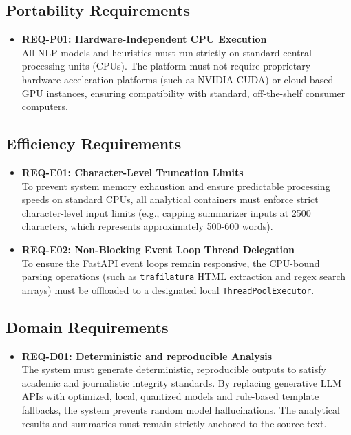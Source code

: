 \subsection{Portability Requirements}
\begin{itemize}
    \item \textbf{REQ-P01: Hardware-Independent CPU Execution} \\
    All NLP models and heuristics must run strictly on standard central processing units (CPUs). The platform must not require proprietary hardware acceleration platforms (such as NVIDIA CUDA) or cloud-based GPU instances, ensuring compatibility with standard, off-the-shelf consumer computers.
\end{itemize}

\subsection{Efficiency Requirements}
\begin{itemize}
    \item \textbf{REQ-E01: Character-Level Truncation Limits} \\
    To prevent system memory exhaustion and ensure predictable processing speeds on standard CPUs, all analytical containers must enforce strict character-level input limits (e.g., capping summarizer inputs at 2500 characters, which represents approximately 500-600 words).
    \item \textbf{REQ-E02: Non-Blocking Event Loop Thread Delegation} \\
    To ensure the FastAPI event loops remain responsive, the CPU-bound parsing operations (such as \texttt{trafilatura} HTML extraction and regex search arrays) must be offloaded to a designated local \texttt{ThreadPoolExecutor}.
\end{itemize}

\subsection{Domain Requirements}
\begin{itemize}
    \item \textbf{REQ-D01: Deterministic and reproducible Analysis} \\
    The system must generate deterministic, reproducible outputs to satisfy academic and journalistic integrity standards. By replacing generative LLM APIs with optimized, local, quantized models and rule-based template fallbacks, the system prevents random model hallucinations. The analytical results and summaries must remain strictly anchored to the source text.
\end{itemize}
